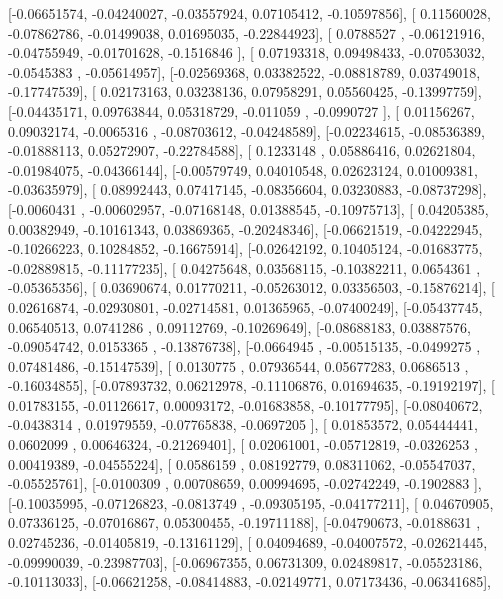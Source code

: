 \documentclass{article}
\begin{document}
       [-0.06651574, -0.04240027, -0.03557924,  0.07105412, -0.10597856],
       [ 0.11560028, -0.07862786, -0.01499038,  0.01695035, -0.22844923],
       [ 0.0788527 , -0.06121916, -0.04755949, -0.01701628, -0.1516846 ],
       [ 0.07193318,  0.09498433, -0.07053032, -0.0545383 , -0.05614957],
       [-0.02569368,  0.03382522, -0.08818789,  0.03749018, -0.17747539],
       [ 0.02173163,  0.03238136,  0.07958291,  0.05560425, -0.13997759],
       [-0.04435171,  0.09763844,  0.05318729, -0.011059  , -0.0990727 ],
       [ 0.01156267,  0.09032174, -0.0065316 , -0.08703612, -0.04248589],
       [-0.02234615, -0.08536389, -0.01888113,  0.05272907, -0.22784588],
       [ 0.1233148 ,  0.05886416,  0.02621804, -0.01984075, -0.04366144],
       [-0.00579749,  0.04010548,  0.02623124,  0.01009381, -0.03635979],
       [ 0.08992443,  0.07417145, -0.08356604,  0.03230883, -0.08737298],
       [-0.0060431 , -0.00602957, -0.07168148,  0.01388545, -0.10975713],
       [ 0.04205385,  0.00382949, -0.10161343,  0.03869365, -0.20248346],
       [-0.06621519, -0.04222945, -0.10266223,  0.10284852, -0.16675914],
       [-0.02642192,  0.10405124, -0.01683775, -0.02889815, -0.11177235],
       [ 0.04275648,  0.03568115, -0.10382211,  0.0654361 , -0.05365356],
       [ 0.03690674,  0.01770211, -0.05263012,  0.03356503, -0.15876214],
       [ 0.02616874, -0.02930801, -0.02714581,  0.01365965, -0.07400249],
       [-0.05437745,  0.06540513,  0.0741286 ,  0.09112769, -0.10269649],
       [-0.08688183,  0.03887576, -0.09054742,  0.0153365 , -0.13876738],
       [-0.0664945 , -0.00515135, -0.0499275 ,  0.07481486, -0.15147539],
       [ 0.0130775 ,  0.07936544,  0.05677283,  0.0686513 , -0.16034855],
       [-0.07893732,  0.06212978, -0.11106876,  0.01694635, -0.19192197],
       [ 0.01783155, -0.01126617,  0.00093172, -0.01683858, -0.10177795],
       [-0.08040672, -0.0438314 ,  0.01979559, -0.07765838, -0.0697205 ],
       [ 0.01853572,  0.05444441,  0.0602099 ,  0.00646324, -0.21269401],
       [ 0.02061001, -0.05712819, -0.0326253 ,  0.00419389, -0.04555224],
       [ 0.0586159 ,  0.08192779,  0.08311062, -0.05547037, -0.05525761],
       [-0.0100309 ,  0.00708659,  0.00994695, -0.02742249, -0.1902883 ],
       [-0.10035995, -0.07126823, -0.0813749 , -0.09305195, -0.04177211],
       [ 0.04670905,  0.07336125, -0.07016867,  0.05300455, -0.19711188],
       [-0.04790673, -0.0188631 ,  0.02745236, -0.01405819, -0.13161129],
       [ 0.04094689, -0.04007572, -0.02621445, -0.09990039, -0.23987703],
       [-0.06967355,  0.06731309,  0.02489817, -0.05523186, -0.10113033],
       [-0.06621258, -0.08414883, -0.02149771,  0.07173436, -0.06341685],
\end{document}
